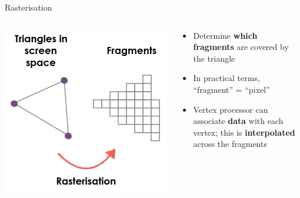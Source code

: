 \begin{frame}{Rasterisation}
	\begin{columns}
		\begin{column}{0.3\textwidth}
			\includegraphics[width=\textwidth]{pipeline_2}
		\end{column}
		\begin{column}{0.65\textwidth}
			\begin{itemize}
				\pause\item Determine \textbf{which fragments} are covered by the triangle
				\pause\item In practical terms, ``fragment'' = ``pixel''
				\pause\item Vertex processor can associate \textbf{data} with each vertex;
					this is \textbf{interpolated} across the fragments
			\end{itemize}
		\end{column}
	\end{columns}
\end{frame}

